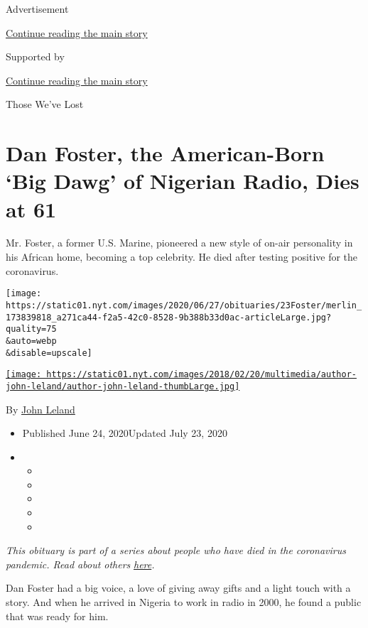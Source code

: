 Advertisement

\protect\hyperlink{after-top}{Continue reading the main story}

Supported by

\protect\hyperlink{after-sponsor}{Continue reading the main story}

Those We've Lost

\hypertarget{dan-foster-the-american-born-big-dawg-of-nigerian-radio-dies-at-61}{%
\section{Dan Foster, the American-Born `Big Dawg' of Nigerian Radio,
Dies at
61}\label{dan-foster-the-american-born-big-dawg-of-nigerian-radio-dies-at-61}}

Mr. Foster, a former U.S. Marine, pioneered a new style of on-air
personality in his African home, becoming a top celebrity. He died after
testing positive for the coronavirus.

\texttt{[image: https://static01.nyt.com/images/2020/06/27/obituaries/23Foster/merlin\_173839818\_a271ca44-f2a5-42c0-8528-9b388b33d0ac-articleLarge.jpg?quality=75\\\&auto=webp\\\&disable=upscale]}

\href{https://www.nytimes.com/by/john-leland}{\texttt{[image: https://static01.nyt.com/images/2018/02/20/multimedia/author-john-leland/author-john-leland-thumbLarge.jpg]}}

By \href{https://www.nytimes.com/by/john-leland}{John Leland}

\begin{itemize}
\item
  Published June 24, 2020Updated July 23, 2020
\item
  \begin{itemize}
  \item
  \item
  \item
  \item
  \item
  \end{itemize}
\end{itemize}

\emph{This obituary is part of a series about people who have died in
the coronavirus pandemic. Read about others}
\href{https://www.nytimes.com/interactive/2020/obituaries/people-died-coronavirus-obituaries.html}{\emph{here}}\emph{.}

Dan Foster had a big voice, a love of giving away gifts and a light
touch with a story. And when he arrived in Nigeria to work in radio in
2000, he found a public that was ready for him.

